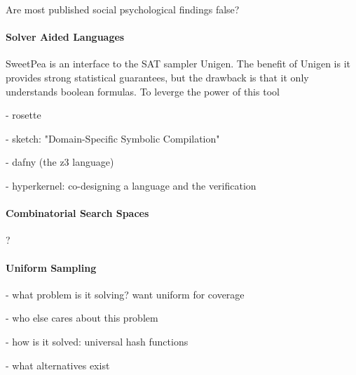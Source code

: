 Are most published social psychological findings false? \cite{stroebe2016most}


\paragraph*{Solver Aided Languages}

SweetPea is an interface to the SAT sampler Unigen. The benefit of Unigen is it provides strong statistical guarantees, but the drawback is that it only understands boolean formulas. To leverge the power of this tool

- rosette \cite{torlak2014lightweight}

- sketch: "Domain-Specific Symbolic Compilation" \cite{bodik2017domain}

- dafny (the z3 language) \cite{leino2013developing}

- hyperkernel: co-designing a language and the verification \cite{nelson2017hyperkernel}


\paragraph*{Combinatorial Search Spaces}
?


\paragraph*{Uniform Sampling}

\cite{meel2016constrained}

- what problem is it solving? want uniform for coverage

- who else cares about this problem

- how is it solved: universal hash functions

- what alternatives exist
